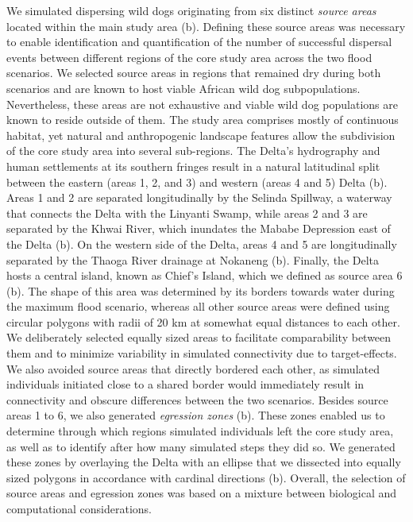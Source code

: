 \documentclass[../FinalThesis.tex]{subfiles}
\begin{document}
We simulated dispersing wild dogs originating from six distinct \textit{source
areas} located within the main study area (b). Defining these
source areas was necessary to enable identification and quantification of the
number of successful dispersal events between different regions of the core
study area across the two flood scenarios. We selected source areas in regions
that remained dry during both scenarios and are known to host viable African
wild dog subpopulations. Nevertheless, these areas are not exhaustive and viable
wild dog populations are known to reside outside of them. The study area
comprises mostly of continuous habitat, yet natural and anthropogenic landscape
features allow the subdivision of the core study area into several sub-regions.
The Delta's hydrography and human settlements at its southern fringes result in
a natural latitudinal split between the eastern (areas 1, 2, and 3) and western
(areas 4 and 5) Delta (b). Areas 1 and 2 are separated
longitudinally by the Selinda Spillway, a waterway that connects the Delta with
the Linyanti Swamp, while areas 2 and 3 are separated by the Khwai River, which
inundates the Mababe Depression east of the Delta (b). On the
western side of the Delta, areas 4 and 5 are longitudinally separated by the
Thaoga River drainage at Nokaneng (b). Finally, the Delta
hosts a central island, known as Chief's Island, which we defined as source area
6 (b). The shape of this area was determined by its borders
towards water during the maximum flood scenario, whereas all other source areas
were defined using circular polygons with radii of 20 km at somewhat equal
distances to each other. We deliberately selected equally sized areas to
facilitate comparability between them and to minimize variability in simulated
connectivity due to target-effects. We also avoided source areas that directly
bordered each other, as simulated individuals initiated close to a shared border
would immediately result in connectivity and obscure differences between the two
scenarios. Besides source areas 1 to 6, we also generated \textit{egression
zones} (b). These zones enabled us to determine through which
regions simulated individuals left the core study area, as well as to identify
after how many simulated steps they did so. We generated these zones by
overlaying the Delta with an ellipse that we dissected into equally sized
polygons in accordance with cardinal directions (b). Overall,
the selection of source areas and egression zones was based on a mixture between
biological and computational considerations.
\end{document}
